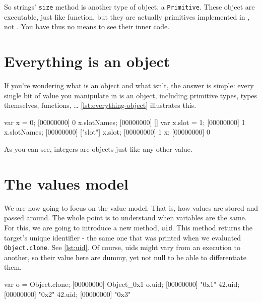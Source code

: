 So strings' \texttt{size} method is another type of object, a
\texttt{Primitive}. These object are executable, just like function,
but they are actually primitives implemented in \Cxx, not \urbi. You
have thus no means to see their inner code.

\section{Everything is an object}

If you're wondering what is an object and what isn't, the answer is
simple: every single bit of value you manipulate in \urbi is an
object, including primitive types, types themselves, functions, \ldots
\autoref{lst:everything-object} illustrates this.

\begin{urbiscript}[caption=Everything is an object,
label=lst:everything-object]
var x = 0;
[00000000] 0
x.slotNames;
[00000000] []
var x.slot = 1;
[00000000] 1
x.slotNames;
[00000000] ["slot"]
x.slot;
[00000000] 1
x;
[00000000] 0
\end{urbiscript}

As you can see, integers are objects just like any other value.

\section{The \urbi values model}

We are now going to focus on the \urbi value model. That is, how
values are stored and passed around. The whole point is to understand
when variables are the same. For this, we are going to introduce a new
method, \texttt{uid}. This method returns the target's unique
identifier - the same one that was printed when we evaluated
\lstinline|Object.clone|. See \autoref{lst:uid}. Of course, uids might vary
from an execution to another, so their value here are dummy, yet not
null to be able to differentiate them.

\begin{urbiscript}[caption=Uids, label=lst:uid]
var o = Object.clone;
[00000000] Object_0x1
o.uid;
[00000000] "0x1"
42.uid;
[00000000] "0x2"
42.uid;
[00000000] "0x3"
\end{urbiscript}

